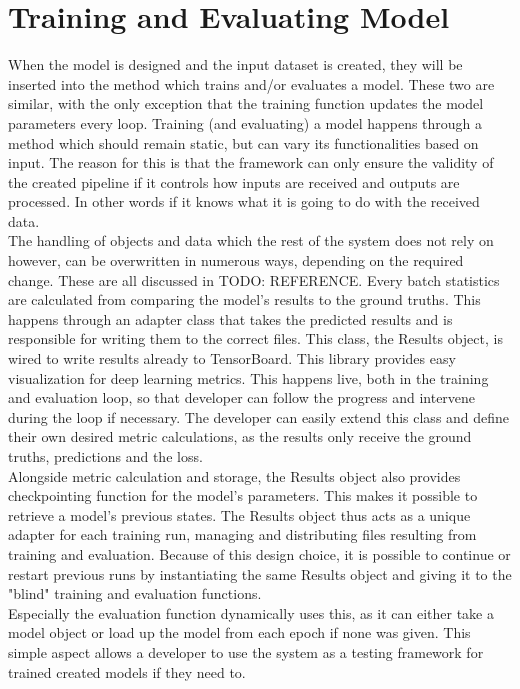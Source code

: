 \section{Training and Evaluating Model}

When the model is designed and the input dataset is created, they will be inserted into the method which trains and/or evaluates a model. These two are similar, with the only exception that the training function updates the model parameters every loop. Training (and evaluating) a model happens through a method which should remain static, but can vary its functionalities based on input. The reason for this is that the framework can only ensure the validity of the created pipeline if it controls how inputs are received and outputs are processed. In other words if it knows what it is going to do with the received data. \\

The handling of objects and data which the rest of the system does not rely on however, can be overwritten in numerous ways, depending on the required change. These are all discussed in TODO: REFERENCE. Every batch statistics are calculated from comparing the model's results to the ground truths. This happens through an adapter class that takes the predicted results and is responsible for writing them to the correct files. This class, the Results object, is wired to write results already to TensorBoard. This library provides easy visualization for deep learning metrics. This happens live, both in the training and evaluation loop, so that developer can follow the progress and intervene during the loop if necessary. The developer can easily extend this class and define their own desired metric calculations, as the results only receive the ground truths, predictions and the loss. \\

Alongside metric calculation and storage, the Results object also provides checkpointing function for the model's parameters. This makes it possible to retrieve a model's previous states. The Results object thus acts as a unique adapter for each training run, managing and distributing files resulting from training and evaluation. Because of this design choice, it is possible to continue or restart previous runs by instantiating the same Results object and giving it to the "blind" training and evaluation functions. \\

Especially the evaluation function dynamically uses this, as it can either take a model object or load up the model from each epoch if none was given. This simple aspect allows a developer to use the system as a testing framework for trained created models if they need to. \\


